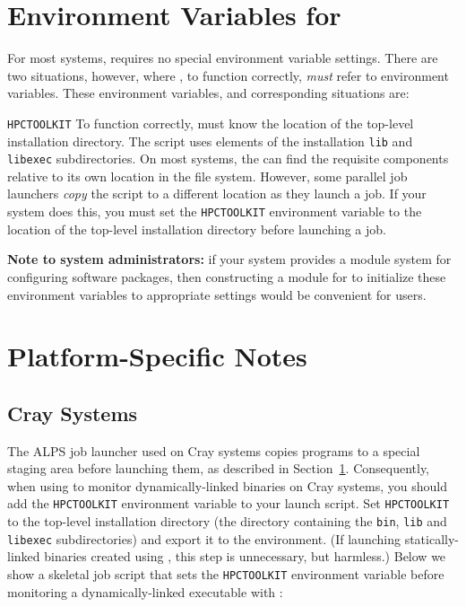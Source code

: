 \section{Environment Variables for \hpcrun{}}
\label{sec:env-vars}
For most systems, \hpcrun{} requires no special environment variable settings.
There are two situations, however, where \hpcrun{}, to function correctly,
\emph{must} refer to environment variables. These environment variables, and
corresponding situations are:
\begin{description}
  \item{\verb|HPCTOOLKIT|} To function correctly, \hpcrun{} must know
       the location of the \HPCToolkit{} top-level installation directory.
       The \hpcrun{} script uses elements of the installation \verb|lib| and
       \verb|libexec| subdirectories. On most systems, the 
       \hpcrun{} can find the requisite
       components relative to its own location in the file system. 
       However, some parallel job launchers \emph{copy} the
       \hpcrun{} script to a different location as they launch a job. If your
       system does this, you must set the \verb|HPCTOOLKIT|
       environment variable to the location of the \HPCToolkit{} top-level installation directory 
       before launching a job.
\end{description}

{\bf Note to system administrators:} if your system provides a module system for configuring 
software packages, then constructing
a module for \HPCToolkit{} to initialize these environment variables to appropriate settings
would be convenient for users.

\section{Platform-Specific Notes}
\label{sec:platform-specific}

%
%
\subsection{Cray Systems}

The ALPS job launcher used on Cray systems copies 
programs to a special staging area before launching them,
as described in Section~\ref{sec:env-vars}.
Consequently, when using \hpcrun{} to monitor dynamically-linked binaries on Cray systems, you
should add the \verb|HPCTOOLKIT| environment variable to your launch
script.  
Set \verb|HPCTOOLKIT| to the top-level \HPCToolkit{} installation directory
(the directory containing the \verb|bin|, \verb|lib| and
\verb|libexec| subdirectories) and export it to the environment.  
(If launching statically-linked binaries created using \hpclink{}, this step is unnecessary, but harmless.)
Below we show a skeletal job script that sets the \verb|HPCTOOLKIT| environment variable  before monitoring 
a dynamically-linked executable with \hpcrun{}: 

